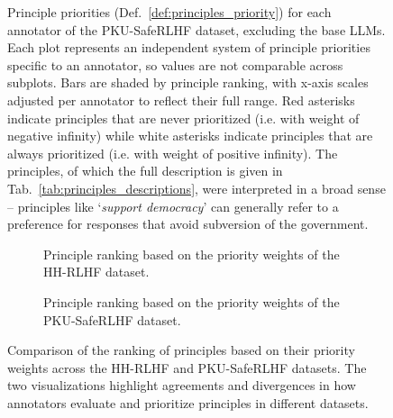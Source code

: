 \documentclass{article}
\begin{document}
\begin{landscape}
\begin{figure}[p]
    \centering
{}
    \caption{Principle priorities (Def.~\ref{def:principles_priority}) for each annotator of the PKU-SafeRLHF dataset, excluding the base LLMs. Each plot represents an independent system of principle priorities specific to an annotator, so values are not comparable across subplots. Bars are shaded by principle ranking, with x-axis scales adjusted per annotator to reflect their full range. Red asterisks indicate principles that are never prioritized (i.e. with weight of negative infinity) while white asterisks indicate principles that are always prioritized (i.e. with weight of positive infinity). The principles, of which the full description is given in  Tab.~\ref{tab:principles_descriptions}, were interpreted in a broad sense -- principles like `\textit{support democracy}' can generally refer to a preference for responses that avoid subversion of the government.
    }
    \label{fig:priority-pku}
\end{figure}
\end{landscape}

\begin{figure}[h!]
    \centering
    \begin{subfigure}{0.49\linewidth}
        \centering
        \caption{Principle ranking based on the priority weights of the HH-RLHF dataset.}
        \label{fig:ranking-hh}
    \end{subfigure}
    \hfill
    \begin{subfigure}{0.49\linewidth}
        \centering
        \caption{Principle ranking based on the priority weights of the PKU-SafeRLHF dataset.}
        \label{fig:ranking-pku}
    \end{subfigure}
    \caption{Comparison of the ranking of principles based on their priority weights across the HH-RLHF and PKU-SafeRLHF datasets. The two visualizations highlight agreements and divergences in how annotators evaluate and prioritize principles in different datasets.}
    \label{fig:ranking-comparison}
\end{figure}
\end{document}
